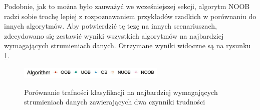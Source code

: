 \noindent Podobnie, jak to można było zauważyć we wcześniejszej sekcji, algorytm NOOB radzi sobie trochę lepiej z rozpoznawaniem przykładów rzadkich w porównaniu do innych algorytmów. Aby potwierdzić tę tezę na innych scenariuszach, zdecydowano się zestawić wyniki wszystkich algorytmów na najbardziej wymagających strumieniach danych. Otrzymane wyniki widoczne są na rysunku \ref{Figure:PairsComparison}.

\begin{figure}[h]
    \centering
    \includegraphics[width=7cm]{figures/algorithms_legend.JPG}
\end{figure}

\vspace{-1.2cm}

\begin{figure}[h]
    \centering
    \qquad
    \caption{Porównanie trafności klasyfikacji na najbardziej wymagających strumieniach danych zawierających dwa czynniki trudności}\label{Figure:PairsComparison}
\end{figure}

